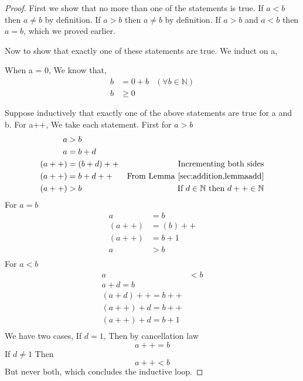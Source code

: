 \documentclass[11pt]{report}
\begin{document}
\begin{proof}
	First we show that no more than one of the statements is true.
	If $a<b$ then $a \neq b$ by definition. If $a>b$ then $a \neq b$ by definition. If $a>b$ and $a<b$ then $a=b$, which we proved earlier.

	Now to show that exactly one of these statements are true.
	We induct on a,

	When a = 0,
	We know that,
	\begin{align*}
		b & = 0 + b & (\forall b \in \mathbb{N}) \\
		b & \geq 0  &
	\end{align*}

	Suppose inductively that exactly one of the above statements are true for a and b.
	For a++,
	We take each statement. First for $a>b$
	\begin{align*}
		a     & > b                                                                  \\
		a     & = b + d                                                              \\
		(a++) & = (b + d)++ & \text{Incrementing both sides}                         \\
		(a++) & = b + d++   & \text{From Lemma \ref{sec:addition,lemmaadd}}          \\
		(a++) & > b         & \text{If $d \in \mathbb{N}$ then $d++ \in \mathbb{N}$}
	\end{align*}
	For $a=b$
	\begin{align*}
		a     & = b     \\
		(a++) & = (b)++ \\
		(a++) & = b + 1 \\
		a     & > b     \\
	\end{align*}
	For $a<b$
	\begin{align*}
		a & <b            \\
		a + d = b         \\
		(a + d)++ = b++   \\
		(a++) + d = b++   \\
		(a++) + d = b + 1 \\
	\end{align*}
	We have two cases,
	If $d = 1$,
	Then by cancellation law
	$$ a++ = b $$
	If $d \neq 1$
	Then
	$$a++ < b$$
	But never both, which concludes the inductive loop.
\end{proof}
\end{document}
